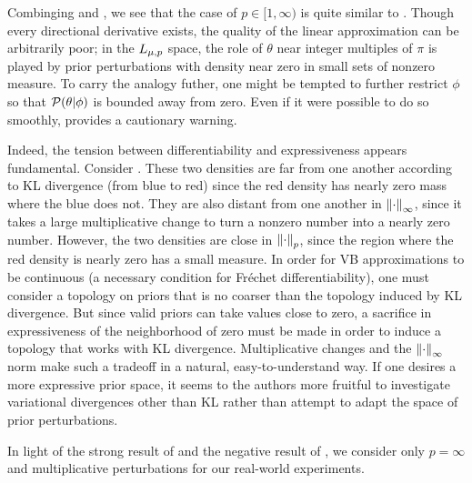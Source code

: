 Combinging  and , we see that the
case of $p \in [1, \infty)$ is quite similar to . Though
every directional derivative exists, the quality of the linear approximation can
be arbitrarily poor; in the ${L_{\mu,p}}$ space, the role of $\theta$ near
integer multiples of $\pi$ is played by prior perturbations with density near
zero in small sets of nonzero measure.  To carry the analogy futher, one might
be tempted to further restrict $\phi$ so that $\mathcal{P}(\theta \vert \phi)$ is bounded
away from zero.  Even if it were possible to do so smoothly,
 provides a cautionary warning.

Indeed, the tension between differentiability and expressiveness appears
fundamental.  Consider .  These two densities are far from one
another according to KL divergence (from blue to red) since the red density has
nearly zero mass where the blue does not.  They are also distant from one
another in $\left\Vert\cdot\right\Vert_{\infty}$, since it takes a large multiplicative change to
turn a nonzero number into a nearly zero number.  However, the two densities are
close in $\left\Vert\cdot\right\Vert_{p}$, since the region where the red density is nearly
zero has a small measure. In order for VB approximations to be continuous (a
necessary condition for Fr{\'e}chet differentiability), one must consider a
topology on priors that is no coarser than the topology induced by KL
divergence.  But since valid priors can take values close to zero, a sacrifice
in expressiveness of the neighborhood of zero must be made in order to induce a
topology that works with KL divergence.  Multiplicative changes and the
$\left\Vert\cdot\right\Vert_{\infty}$ norm make such a tradeoff in a natural, easy-to-understand
way.  If one desires a more expressive prior space, it seems to the authors more
fruitful to investigate variational divergences other than KL rather than
attempt to adapt the space of prior perturbations.

\FunctionDistFig{}

In light of the strong result of  and the negative result
of , we consider only $p = \infty$ and multiplicative
perturbations for our real-world experiments.
